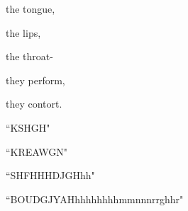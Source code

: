 \documentclass[extrafontsizes, 48pt]{memoir}
\newcommand\blankpage{%
    \null
    \thispagestyle{empty}%
    \addtocounter{page}{-1}%
    \newpage}
\begin{document}
	\begin{minipage}{.6\textwidth}
	the tongue, 
	\end{minipage}
	\newpage

	\begin{minipage}{.6\textwidth}
	the lips,
	\end{minipage}
	\newpage

	\begin{minipage}{.6\textwidth}
	the throat-
	\end{minipage}
	\newpage

	\begin{minipage}{.6\textwidth}
	they perform,
	\end{minipage}
	\newpage

	\begin{minipage}{.6\textwidth}
	they contort.
	\afterpage{\blankpage}
	\end{minipage}
	\newpage

	\begin{minipage}{.6\textwidth}
	``KSHGH"
	\end{minipage}
	\newpage

	\begin{minipage}{.6\textwidth}
	``KREAWGN"
	\end{minipage}
	\newpage

	\begin{minipage}{.6\textwidth}
	``SHFHHHDJGHhh"
	\end{minipage}
	\newpage

	\begin{minipage}{.6\textwidth}
	``BOUDGJYAHhhhhhhhhmmnnnrrghhr"
	\afterpage{\blankpage}
	\end{minipage}
	\newpage
\end{document}
